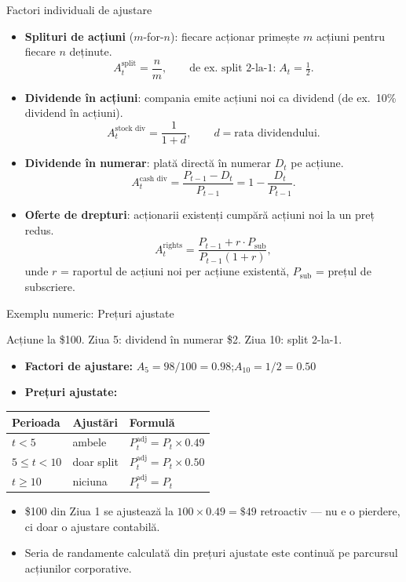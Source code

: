 \documentclass[9pt, aspectratio=169, t]{beamer}
\theoremstyle{definition}
\begin{document}
\begin{frame}{Factori individuali de ajustare}
\begin{itemize}
    \item \textbf{Splituri de acțiuni} ($m$-for-$n$): fiecare acționar primește $m$ acțiuni pentru fiecare $n$ deținute.
    \[
    A_t^{\text{split}} = \frac{n}{m}, \qquad \text{de ex.\ split 2-la-1:}\; A_t = \tfrac{1}{2}.
    \]
    \item \textbf{Dividende în acțiuni}: compania emite acțiuni noi ca dividend (de ex.\ 10\% dividend în acțiuni).
    \[
    A_t^{\text{stock div}} = \frac{1}{1+d}, \qquad d = \text{rata dividendului}.
    \]
    \item \textbf{Dividende în numerar}: plată directă în numerar $D_t$ pe acțiune.
    \[
    A_t^{\text{cash div}} = \frac{P_{t-1} - D_t}{P_{t-1}} = 1 - \frac{D_t}{P_{t-1}}.
    \]
    \item \textbf{Oferte de drepturi}: acționarii existenți cumpără acțiuni noi la un preț redus.
    \[
    A_t^{\text{rights}} = \frac{P_{t-1} + r \cdot P_{\text{sub}}}{P_{t-1}(1+r)},
    \]
    unde $r$ = raportul de acțiuni noi per acțiune existentă, $P_{\text{sub}}$ = prețul de subscriere.
\end{itemize}
\end{frame}

\begin{frame}{Exemplu numeric: Prețuri ajustate}
\begin{example}
Acțiune la \$100. Ziua 5: dividend în numerar \$2. Ziua 10: split 2-la-1.
\end{example}
\begin{itemize}
    \item \textbf{Factori de ajustare:} $A_5 = 98/100 = 0.98$;\quad $A_{10} = 1/2 = 0.50$
    \item \textbf{Prețuri ajustate:}
\end{itemize}
\vspace{-0.1cm}
\begin{center}
{\small
\renewcommand{\arraystretch}{1.2}
\begin{tabular}{lll}
\toprule
\textbf{Perioada} & \textbf{Ajustări} & \textbf{Formulă} \\
\midrule
$t < 5$ & ambele & $P_t^{\text{adj}} = P_t \times 0.49$ \\
$5 \leq t < 10$ & doar split & $P_t^{\text{adj}} = P_t \times 0.50$ \\
$t \geq 10$ & niciuna & $P_t^{\text{adj}} = P_t$ \\
\bottomrule
\end{tabular}
}
\end{center}
\vspace{0.05cm}
\begin{itemize}
    \item \$100 din Ziua 1 se ajustează la $100 \times 0.49 = \$49$ retroactiv --- nu e o pierdere, ci doar o ajustare contabilă.
    \item Seria de randamente calculată din prețuri ajustate este continuă pe parcursul acțiunilor corporative.
\end{itemize}
\end{frame}
\end{document}
